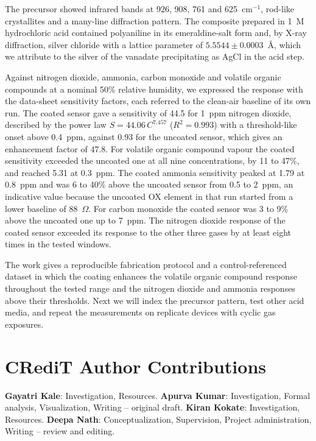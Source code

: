 \documentclass[preprint,11pt]{elsarticle}
\begin{document}
The precursor showed infrared bands at 926, 908, 761 and 625~cm$^{-1}$, rod-like crystallites and a many-line diffraction pattern. The composite prepared in 1~M hydrochloric acid contained polyaniline in its emeraldine-salt form and, by X-ray diffraction, silver chloride with a lattice parameter of $5.5544 \pm 0.0003$~\AA, which we attribute to the silver of the vanadate precipitating as AgCl in the acid step.

Against nitrogen dioxide, ammonia, carbon monoxide and volatile organic compounds at a nominal 50\% relative humidity, we expressed the response with the data-sheet sensitivity factors, each referred to the clean-air baseline of its own run. The coated sensor gave a sensitivity of 44.5 for 1~ppm nitrogen dioxide, described by the power law $S = 44.06\,C^{7.457}$ ($R^{2}=0.993$) with a threshold-like onset above 0.4~ppm, against 0.93 for the uncoated sensor, which gives an enhancement factor of 47.8. For volatile organic compound vapour the coated sensitivity exceeded the uncoated one at all nine concentrations, by 11 to 47\%, and reached 5.31 at 0.3~ppm. The coated ammonia sensitivity peaked at 1.79 at 0.8~ppm and was 6 to 40\% above the uncoated sensor from 0.5 to 2~ppm, an indicative value because the uncoated OX element in that run started from a lower baseline of 88~$\Omega$. For carbon monoxide the coated sensor was 3 to 9\% above the uncoated one up to 7~ppm. The nitrogen dioxide response of the coated sensor exceeded its response to the other three gases by at least eight times in the tested windows.

The work gives a reproducible fabrication protocol and a control-referenced dataset in which the coating enhances the volatile organic compound response throughout the tested range and the nitrogen dioxide and ammonia responses above their thresholds. Next we will index the precursor pattern, test other acid media, and repeat the measurements on replicate devices with cyclic gas exposures.

\FloatBarrier
\section*{CRediT Author Contributions}
\textbf{Gayatri Kale}: Investigation, Resources. \textbf{Apurva Kumar}: Investigation, Formal analysis, Visualization, Writing -- original draft. \textbf{Kiran Kokate}: Investigation, Resources. \textbf{Deepa Nath}: Conceptualization, Supervision, Project administration, Writing -- review and editing.
\end{document}
